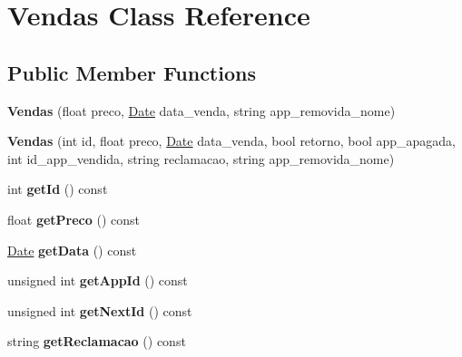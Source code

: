 \hypertarget{class_vendas}{\section{Vendas Class Reference}
\label{class_vendas}
}
\subsection*{Public Member Functions}
\begin{DoxyCompactItemize}
\item 
\hypertarget{class_vendas_ac2ccb77508f649d75e3635c9d51d27fc}{{\bfseries Vendas} (float preco, \hyperlink{class_date}{Date} data\+\_\+venda, string app\+\_\+removida\+\_\+nome)}\label{class_vendas_ac2ccb77508f649d75e3635c9d51d27fc}

\item 
\hypertarget{class_vendas_a770db3bf09757d984d4335eae6b25802}{{\bfseries Vendas} (int id, float preco, \hyperlink{class_date}{Date} data\+\_\+venda, bool retorno, bool app\+\_\+apagada, int id\+\_\+app\+\_\+vendida, string reclamacao, string app\+\_\+removida\+\_\+nome)}\label{class_vendas_a770db3bf09757d984d4335eae6b25802}

\item 
\hypertarget{class_vendas_a7e36a98494bec3b57d90afa0536a1be5}{int {\bfseries get\+Id} () const }\label{class_vendas_a7e36a98494bec3b57d90afa0536a1be5}

\item 
\hypertarget{class_vendas_aa5c8bcaced98ded9a22444ddf5935566}{float {\bfseries get\+Preco} () const }\label{class_vendas_aa5c8bcaced98ded9a22444ddf5935566}

\item 
\hypertarget{class_vendas_ab4f3bd058d7cfe6fc837e7804b9b3dcf}{\hyperlink{class_date}{Date} {\bfseries get\+Data} () const }\label{class_vendas_ab4f3bd058d7cfe6fc837e7804b9b3dcf}

\item 
\hypertarget{class_vendas_a26578f098712d9ff4cca17e0d8ac86ab}{unsigned int {\bfseries get\+App\+Id} () const }\label{class_vendas_a26578f098712d9ff4cca17e0d8ac86ab}

\item 
\hypertarget{class_vendas_a3a23da44b124f50b3e73e5f568046695}{unsigned int {\bfseries get\+Next\+Id} () const }\label{class_vendas_a3a23da44b124f50b3e73e5f568046695}

\item 
\hypertarget{class_vendas_a13064baa0f6c550cd433946c96a6d0aa}{string {\bfseries get\+Reclamacao} () const }\label{class_vendas_a13064baa0f6c550cd433946c96a6d0aa}


\end{DoxyCompactItemize}
